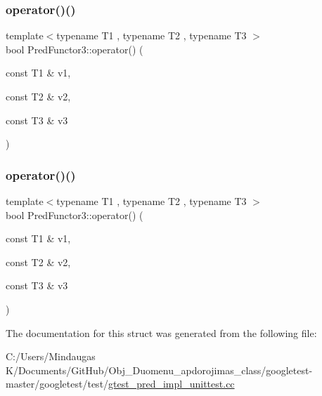 \mbox{\label{struct_pred_functor3_a08b0c59189570fb8eb7e2c7452fec995}} 
\subsubsection{\texorpdfstring{operator()()}{operator()()}\hspace{0.1cm}{\footnotesize\ttfamily [2/3]}}
{\footnotesize\ttfamily template$<$typename T1 , typename T2 , typename T3 $>$ \\
bool Pred\+Functor3\+::operator() (\begin{DoxyParamCaption}\item[{const T1 \&}]{v1,  }\item[{const T2 \&}]{v2,  }\item[{const T3 \&}]{v3 }\end{DoxyParamCaption})\hspace{0.3cm}{\ttfamily [inline]}}

\mbox{\label{struct_pred_functor3_a08b0c59189570fb8eb7e2c7452fec995}} 
\subsubsection{\texorpdfstring{operator()()}{operator()()}\hspace{0.1cm}{\footnotesize\ttfamily [3/3]}}
{\footnotesize\ttfamily template$<$typename T1 , typename T2 , typename T3 $>$ \\
bool Pred\+Functor3\+::operator() (\begin{DoxyParamCaption}\item[{const T1 \&}]{v1,  }\item[{const T2 \&}]{v2,  }\item[{const T3 \&}]{v3 }\end{DoxyParamCaption})\hspace{0.3cm}{\ttfamily [inline]}}



The documentation for this struct was generated from the following file\+:\begin{DoxyCompactItemize}
\item 
C\+:/\+Users/\+Mindaugas K/\+Documents/\+Git\+Hub/\+Obj\+\_\+\+Duomenu\+\_\+apdorojimas\+\_\+class/googletest-\/master/googletest/test/\mbox{\hyperlink{googletest-master_2googletest_2test_2gtest__pred__impl__unittest_8cc}{gtest\+\_\+pred\+\_\+impl\+\_\+unittest.\+cc}}\end{DoxyCompactItemize}
